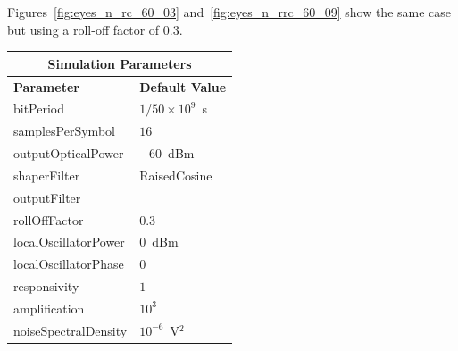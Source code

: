 Figures~\ref{fig:eyes_n_rc_60_03} and~\ref{fig:eyes_n_rrc_60_09} show the same
case but using a roll-off factor of 0.3.
\begin{table}[H]
	\centering
	\footnotesize
	\begin{tabular}{|l|l|}
		\hline
		\multicolumn{2}{|c|}{ \textbf{Simulation Parameters} } \\
		\hline
		\textbf{Parameter}     & \textbf{Default Value}                                     \\\hline
		bitPeriod              & $1/50\times10^9$~s														\\\hline
		samplesPerSymbol       & $16$                                                       \\\hline
		outputOpticalPower     & $-60$~dBm 													\\ \hline
		shaperFilter	       & RaisedCosine												\\ \hline
		outputFilter		   &   												\\ \hline
		rollOffFactor		   & 0.3														\\ \hline
		localOscillatorPower   & $0$~dBm                                                    \\ \hline
		localOscillatorPhase   & $0$                                                        \\ \hline
		responsivity           & $1$                                                        \\ \hline
		amplification          & $10^3$                                                     \\ \hline
		noiseSpectralDensity   & $10^{-6}$~V$^2$                             					\\ \hline
	\end{tabular}
\end{table}
